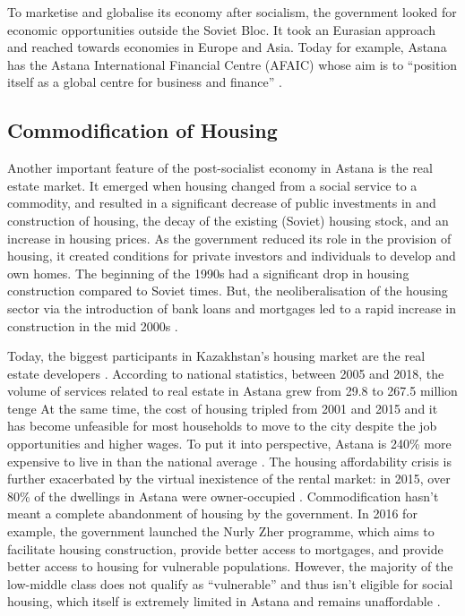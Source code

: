 \documentclass{article}
\begin{document}
To marketise and globalise its economy after socialism, the government looked for economic opportunities outside the Soviet Bloc. It took an Eurasian approach and reached towards economies in Europe and Asia. Today for example, Astana has the Astana International Financial Centre (AFAIC) whose aim is to ``position itself as a global centre for business and finance'' \parencite{aifc}. 

\subsection{Commodification of Housing}

Another important feature of the post-socialist economy in Astana is the real estate market. It emerged when housing changed from a social service to a commodity, and resulted in a significant decrease of public investments in and construction of housing, the decay of the existing (Soviet) housing stock, and an increase in housing prices. 
As the government reduced its role in the provision of housing, it created conditions for private investors and individuals to develop and own homes. The beginning of the 1990s had a significant drop in housing construction compared to Soviet times. But, the neoliberalisation of the housing sector via the introduction of bank loans and mortgages led to a rapid increase in construction in the mid 2000s \parencite{unece2018housing}.

Today, the biggest participants in Kazakhstan's housing market are the real estate developers \parencite{unece2018housing}. According to national statistics, between 2005 and 2018, the volume of services related to real estate in Astana grew from 29.8 to 267.5 million tenge %
At the same time, the cost of housing tripled from 2001 and 2015 \parencite{seitz2021urbanization} and it has become unfeasible for most households to move to the city despite the job opportunities and higher wages. To put it into perspective, Astana is 240\% more expensive to live in than the national average \parencite{seitz2021urbanization}. The housing affordability crisis is further exacerbated by the virtual inexistence of the rental market: in 2015, over 80\% of the dwellings in Astana were owner-occupied \parencite{seitz2021urbanization}.
Commodification hasn't meant a complete abandonment of housing by the government. In 2016 for example, the government launched the Nurly Zher programme, which aims to facilitate housing construction, provide better access to mortgages, and provide better access to housing for vulnerable populations. However, the majority of the low-middle class does not qualify as ``vulnerable'' and thus isn't eligible for social housing, which itself is extremely limited in Astana and remains unaffordable \parencite{unece2018housing}.
\end{document}
